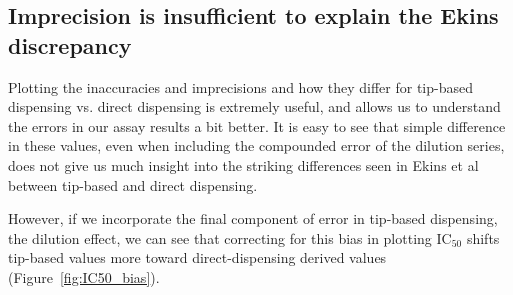 \documentclass[aps,pre,twocolumn,nofootinbib,superscriptaddress,linenumbers]{revtex4-1}
\begin{document}
\subsection*{Imprecision is insufficient to explain the Ekins discrepancy}

Plotting the inaccuracies and imprecisions and how they differ for tip-based dispensing vs. direct dispensing is extremely useful, and allows us to understand the errors in our assay results a bit better. 
It is easy to see that simple difference in these values, even when including the compounded error of the dilution series, does not give us much insight into the striking differences seen in Ekins et al between tip-based and direct dispensing.

However, if we incorporate the final component of error in tip-based dispensing, the dilution effect, we can see that correcting for this bias in plotting IC$_{50}$ shifts tip-based values more toward direct-dispensing derived values (Figure~\ref{fig:IC50_bias}).
\end{document}
